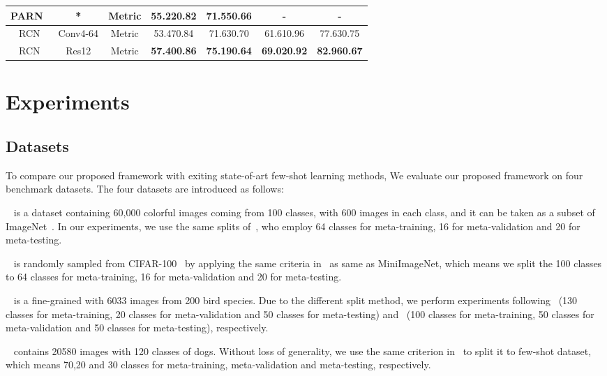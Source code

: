 \documentclass[letterpaper]{article}
\begin{document}
\begin{table*}
\begin{center}
{\begin{tabular}{c c c c c c c}
   PARN~\cite{wu2019parn} & * & Metric & 55.220.82 & 71.550.66 & - & -\\
  \hline
   RCN& Conv4-64 & Metric & 53.470.84 & 71.630.70 & 61.610.96 & 77.630.75\\
   RCN& Res12& Metric & \textbf{57.400.86} & \textbf{75.190.64} & \textbf{69.020.92} & \textbf{82.960.67} \\
  \hline
\end{tabular}}
\label{table: mini}
\end{center}
\end{table*}

\section{Experiments}\label{section: Experiments}

\subsection{Datasets}
To compare our proposed framework with exiting state-of-art few-shot learning methods, We evaluate our proposed framework on four benchmark datasets. The four datasets are introduced as follows: 

~\cite{VinyalsMatching}
 is a dataset containing 60,000 colorful images coming from 100 classes, with 600 images in each class, and it can be taken as a subset of ImageNet~\cite{deng2009imagenet}. In our experiments, we use the same splits of~\cite{snell2017prototypical}, who employ 64 classes for meta-training, 16 for meta-validation and 20 for meta-testing.

~\cite{bertinetto2018meta} is randomly sampled from CIFAR-100~\cite{krizhevsky2009learning} by applying the same criteria in~\cite{bertinetto2018meta} as same as MiniImageNet, which means we split the 100 classes to 64 classes for meta-training, 16 for meta-validation and 20 for meta-testing. 

~\cite{welinder2010cub} is a fine-grained with 6033 images from
200 bird species. Due to the different split method, we perform experiments following~\cite{li2019revisiting} (130 classes for meta-training, 20 classes for meta-validation and 50 classes for meta-testing) and~\cite{chen2019closerfewshot} (100 classes for meta-training, 50 classes for meta-validation and 50 classes for meta-testing), respectively.


~\cite{stanforddogs} contains 20580 images with 120 classes of dogs. Without loss of generality, we use the same criterion in~\cite{li2019revisiting} to split it to few-shot dataset, which means 70,20 and 30 classes for meta-training, meta-validation and meta-testing, respectively.
\end{document}
